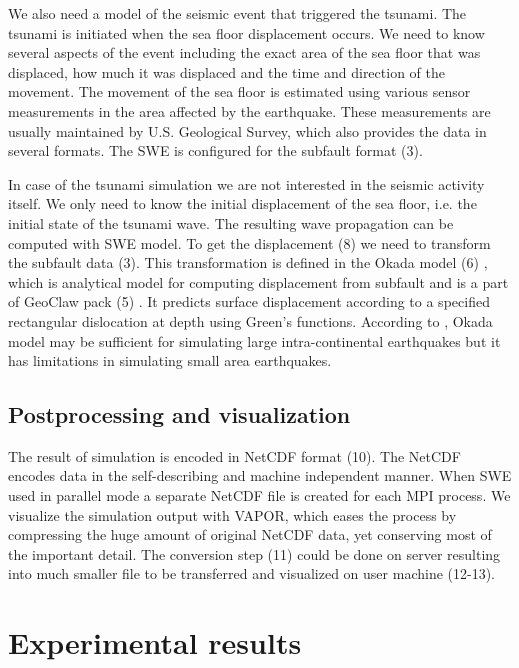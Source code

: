 \documentclass{usiinftr}
\begin{document}
We also need a model of the seismic event that triggered the tsunami. The tsunami is initiated when the sea floor displacement  occurs.
We need to know several aspects of the event including the exact area of the sea floor that was displaced, how much it was displaced
and the time and direction of the movement. The movement of the sea floor is estimated using various sensor measurements
in the area affected by the earthquake. These measurements are usually maintained by U.S. Geological Survey, which also provides
the data in several formats. The SWE is configured for the subfault format (3). 

In case of the tsunami simulation we are not interested in the seismic activity itself. We only need to know the initial displacement
of the sea floor, i.e. the initial state of the tsunami wave. The resulting wave propagation can be computed with SWE model. To get the displacement (8) we need to transform the subfault data (3). This transformation
is defined in the Okada model (6) \cite{okada}, which is analytical model for computing displacement from subfault and is a part of GeoClaw pack (5) \cite{geoclaw}.
It predicts surface displacement according to a specified rectangular dislocation at depth using Green's functions.
According to \cite{okada1}, Okada model may be sufficient for simulating large intra-continental earthquakes but
it has limitations in simulating small area earthquakes.

\subsection{Postprocessing and visualization}
The result of simulation is encoded in NetCDF format (10). The NetCDF encodes data in the self-describing
and machine independent manner. When SWE used in parallel mode a separate NetCDF file is created for each MPI process.
We visualize the simulation output with {VAPOR}, which eases the process by compressing the huge amount of original NetCDF data,
yet conserving most of the important detail. The conversion step (11) could be done on server resulting into much smaller
file to be transferred and visualized on user machine (12-13).

\section{Experimental results}
\label{sec:experiments}
\end{document}
